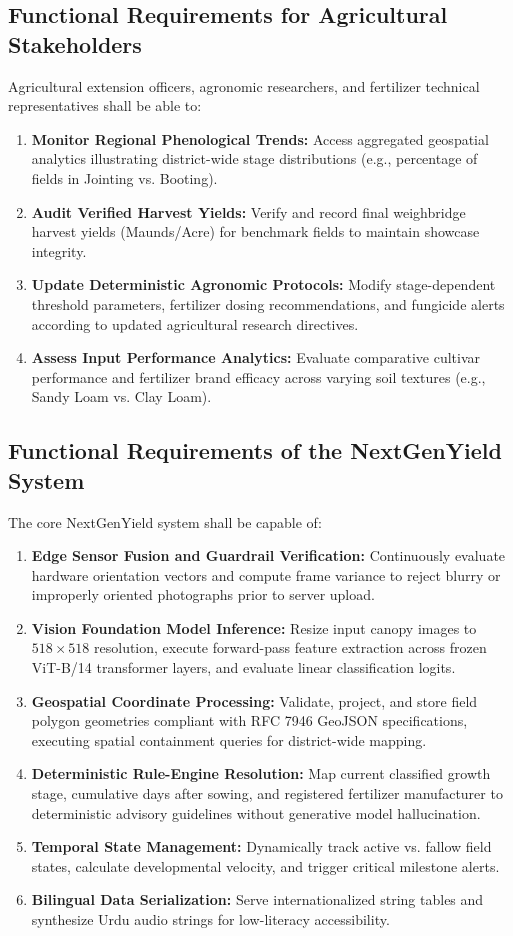 \documentclass{FastFyp}
\begin{document}
\subsection{Functional Requirements for Agricultural Stakeholders}
Agricultural extension officers, agronomic researchers, and fertilizer technical representatives shall be able to:
\begin{enumerate}
    \item \textbf{Monitor Regional Phenological Trends:} Access aggregated geospatial analytics illustrating district-wide stage distributions (e.g., percentage of fields in Jointing vs. Booting).
    \item \textbf{Audit Verified Harvest Yields:} Verify and record final weighbridge harvest yields (Maunds/Acre) for benchmark fields to maintain showcase integrity.
    \item \textbf{Update Deterministic Agronomic Protocols:} Modify stage-dependent threshold parameters, fertilizer dosing recommendations, and fungicide alerts according to updated agricultural research directives.
    \item \textbf{Assess Input Performance Analytics:} Evaluate comparative cultivar performance and fertilizer brand efficacy across varying soil textures (e.g., Sandy Loam vs. Clay Loam).
\end{enumerate}

\subsection{Functional Requirements of the NextGenYield System}
The core NextGenYield system shall be capable of:
\begin{enumerate}
    \item \textbf{Edge Sensor Fusion and Guardrail Verification:} Continuously evaluate hardware orientation vectors and compute frame variance to reject blurry or improperly oriented photographs prior to server upload.
    \item \textbf{Vision Foundation Model Inference:} Resize input canopy images to $518 \times 518$ resolution, execute forward-pass feature extraction across frozen ViT-B/14 transformer layers, and evaluate linear classification logits.
    \item \textbf{Geospatial Coordinate Processing:} Validate, project, and store field polygon geometries compliant with RFC 7946 GeoJSON specifications, executing spatial containment queries for district-wide mapping.
    \item \textbf{Deterministic Rule-Engine Resolution:} Map current classified growth stage, cumulative days after sowing, and registered fertilizer manufacturer to deterministic advisory guidelines without generative model hallucination.
    \item \textbf{Temporal State Management:} Dynamically track active vs. fallow field states, calculate developmental velocity, and trigger critical milestone alerts.
    \item \textbf{Bilingual Data Serialization:} Serve internationalized string tables and synthesize Urdu audio strings for low-literacy accessibility.
\end{enumerate}
\end{document}
